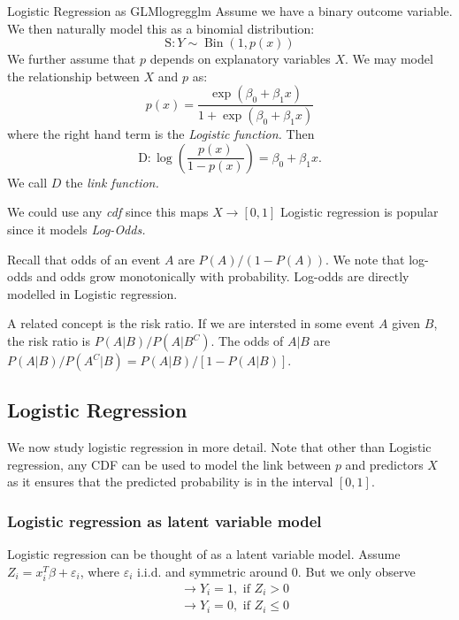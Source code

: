 \documentclass[11pt, %
	oneside, %
	english, %
	onehalfspacing, %
	]{article} %
\numberwithin{equation}{section}
\begin{document}
\begin{example}{Logistic Regression as GLM}{logregglm}
    Assume we have a binary outcome variable. We then naturally model this as a binomial distribution:
    \begin{equation*}
            \mathrm{S}: Y \sim \operatorname{Bin}(1, p(x))
    \end{equation*}
    We further assume that $p$ depends on explanatory variables $X$.  We may model the relationship between $X$ and $p$ as:
    \begin{equation*}
        p(x)=\frac{\exp \left(\beta_0+\beta_1 x\right)}{1+\exp \left(\beta_0+\beta_1 x\right)}
    \end{equation*}
    where the right hand term is the \emph{Logistic function.} Then
    \begin{equation*}
        \mathrm{D}: \log \left(\frac{p(x)}{1-p(x)}\right)=\beta_0+\beta_1 x.
    \end{equation*}
    We call $D$ the \emph{link function.}

    We could use any \emph{cdf} since this maps $X \to [0,1]$ Logistic regression is popular since it models \emph{Log-Odds.}

    Recall that odds of an event $A$ are $P(A) / (1-P(A))$. We note that log-odds and odds grow monotonically with probability. Log-odds are directly modelled in Logistic regression.

    A related concept is the risk ratio. If we are intersted in some event $A$ given $B$, the risk ratio is $P(A | B) / P(A | B^C)$. The odds of $A | B$ are $P (A | B) / P(A^C| B) = P(A | B) / \left[1-P(A | B)\right]$.
\end{example}




\subsection{Logistic Regression}

We now study logistic regression in more detail. Note that other than Logistic regression, any CDF can be used to model the link between $p$ and predictors $X$ as it ensures that the predicted probability is in the interval $[0,1]$.

\subsubsection*{Logistic regression as latent variable model}

Logistic regression can be thought of as a latent variable model.
Assume $Z_i=x_i^T \beta+\varepsilon_i$, where $\varepsilon_i$ i.i.d. and symmetric around 0. But we only observe
$$
\begin{aligned}
& \rightarrow Y_i=1, \text { if } Z_i>0 \\
& \rightarrow Y_i=0, \text { if } Z_i \leq 0
\end{aligned}
$$
\end{document}
